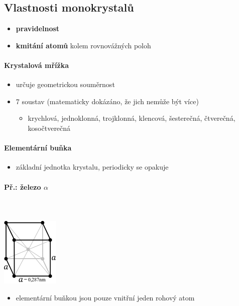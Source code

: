 \documentclass[10pt,a4paper]{article}
\begin{document}
\subsection{Vlastnosti monokrystalů}
\begin{itemize}
\item \textbf{pravidelnost}
\item \textbf{kmitání atomů} kolem rovnovážných poloh
\end{itemize}

\paragraph{Krystalová mřížka}
\begin{itemize}
\item určuje geometrickou souměrnost
\item 7 soustav (matematicky dokázáno, že jich nemůže být více)
\begin{itemize}
	\item krychlová, jednoklonná, trojklonná, klencová, šesterečná, čtverečná, kosočtverečná
\end{itemize}
\end{itemize}

\paragraph{Elementární buňka}
\begin{itemize}
\item základní jednotka krystalu, periodicky se opakuje
\end{itemize}

\paragraph{Př.: železo $\alpha$}\mbox{}\\ \mbox{} \\
\includegraphics[scale=0.5]{pictures/001.png}
\begin{itemize}
\item elementární buňkou jsou pouze vnitřní jeden rohový atom
\end{itemize}
\end{document}
